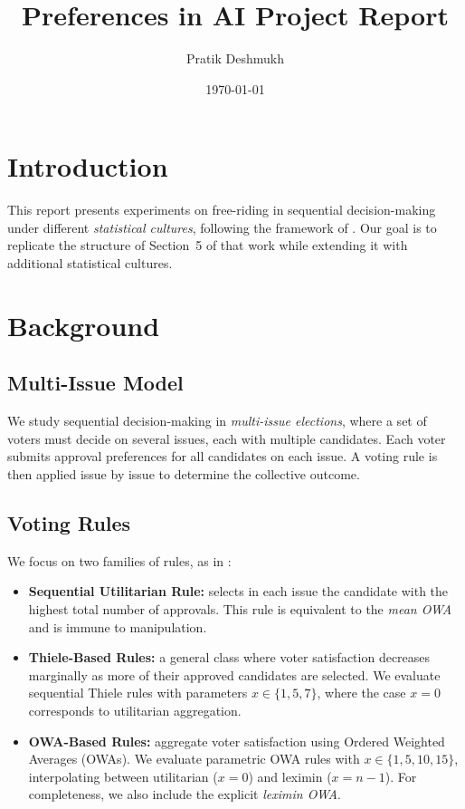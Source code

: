 \documentclass[11pt]{article}
\title{Preferences in AI Project Report}
\author{Pratik Deshmukh}
\date{\today}
\begin{document}
\maketitle

\section{Introduction}
This report presents experiments on free-riding in sequential decision-making
under different \emph{statistical cultures}, following the framework of
\cite{lackner2023freeriding}. Our goal is to replicate the structure of Section~5
of that work while extending it with additional statistical cultures.

\section{Background}

\subsection{Multi-Issue Model}
We study sequential decision-making in \emph{multi-issue elections}, where a set
of voters must decide on several issues, each with multiple candidates. Each
voter submits approval preferences for all candidates on each issue. A voting
rule is then applied issue by issue to determine the collective outcome.

\subsection{Voting Rules}
We focus on two families of rules, as in \cite{lackner2023freeriding}:

\begin{itemize}
    \item \textbf{Sequential Utilitarian Rule:} selects in each issue the
    candidate with the highest total number of approvals. This rule is equivalent
    to the \emph{mean OWA} and is immune to manipulation.
    \item \textbf{Thiele-Based Rules:} a general class where voter satisfaction
    decreases marginally as more of their approved candidates are selected.
    We evaluate sequential Thiele rules with parameters $x \in \{1,5,7\}$,
    where the case $x=0$ corresponds to utilitarian aggregation.
    \item \textbf{OWA-Based Rules:} aggregate voter satisfaction using Ordered
    Weighted Averages (OWAs). We evaluate parametric OWA rules with
    $x \in \{1,5,10,15\}$, interpolating between utilitarian ($x=0$) and
    leximin ($x=n-1$). For completeness, we also include the explicit
    \emph{leximin OWA}.
\end{itemize}
\end{document}
